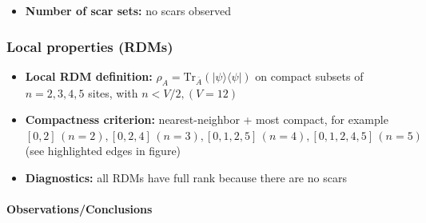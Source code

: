 \documentclass[11pt,a4paper]{article}
\begin{document}
\begin{itemize}[leftmargin=1.5em]
  \item \textbf{Number of scar sets:} no scars observed
  \end{itemize}

\subsubsection*{Local properties (RDMs)}

\begin{itemize}[leftmargin=1.5em]
  \item \textbf{Local RDM definition:} $\rho_A=\mathrm{Tr}_{\bar A}(|\psi\rangle\langle\psi|)$ on compact subsets of $n=2,3,4,5$ sites, with $n < V/2, (V=12)$
  \item \textbf{Compactness criterion:} nearest-neighbor + most compact, for example $[0,2] \, (n = 2), [0,2,4] \, (n = 3), [0,1,2,5] \,  (n = 4), [0,1,2,4,5] \, (n = 5)$ (see highlighted edges in figure)
  \item \textbf{Diagnostics:} all RDMs have full rank because there are no scars
\end{itemize}


\paragraph*{Observations/Conclusions}
\end{document}
